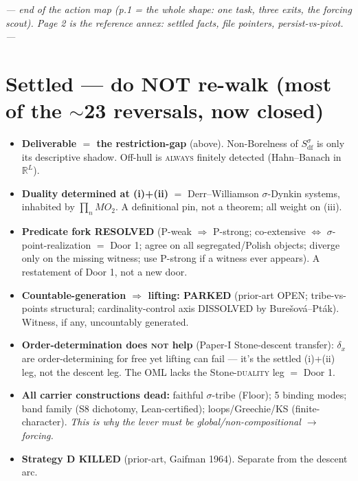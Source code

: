 \documentclass[9pt]{extarticle}
\newcommand{\Sdfs}{S_{\mathrm{df}}^{\sigma}}
\begin{document}
\vspace{2pt}
\begin{center}\footnotesize\itshape
--- end of the action map (p.1 = the whole shape: one task, three exits, the forcing
scout). Page 2 is the reference annex: settled facts, file pointers, persist-vs-pivot. ---
\end{center}

\clearpage
\section*{Settled --- do NOT re-walk (most of the $\sim$23 reversals, now closed)}

\begin{itemize}[leftmargin=1.3em,topsep=1pt,itemsep=1pt]
  \item \textbf{Deliverable $=$ the restriction-gap} (above). Non-Borelness of $\Sdfs$ is
        only its descriptive shadow. Off-hull is \textsc{always} finitely detected
        (Hahn--Banach in $\mathbb{R}^L$).
  \item \textbf{Duality determined at (i)+(ii)} $=$ Derr--Williamson $\sigma$-Dynkin
        systems, inhabited by $\prod_n MO_2$. A definitional pin, not a theorem; all
        weight on (iii).
  \item \textbf{Predicate fork RESOLVED} (P-weak $\Rightarrow$ P-strong; co-extensive
        $\Leftrightarrow$ $\sigma$-point-realization $=$ Door 1; agree on all
        segregated/Polish objects; diverge only on the missing witness; use P-strong if a
        witness ever appears). A restatement of Door 1, not a new door.
  \item \textbf{Countable-generation $\Rightarrow$ lifting: PARKED} (prior-art OPEN;
        tribe-vs-points structural; cardinality-control axis DISSOLVED by
        Bure\v{s}ov\'a--Pt\'ak). Witness, if any, uncountably generated.
  \item \textbf{Order-determination does \textsc{not} help} (Paper-I Stone-descent
        transfer): $\delta_x$ are order-determining for free yet lifting can fail --- it's
        the settled (i)+(ii) leg, not the descent leg. The OML lacks the
        Stone-\textsc{duality} leg $=$ Door 1.
  \item \textbf{All carrier constructions dead:} faithful $\sigma$-tribe (Floor); 5
        binding modes; band family (S8 dichotomy, Lean-certified);
        loops/Greechie/KS (finite-character). \emph{This is why the lever must be
        global/non-compositional $\to$ forcing.}
  \item \textbf{Strategy D KILLED} (prior-art, Gaifman 1964). Separate from the descent
        arc.
\end{itemize}
\end{document}
